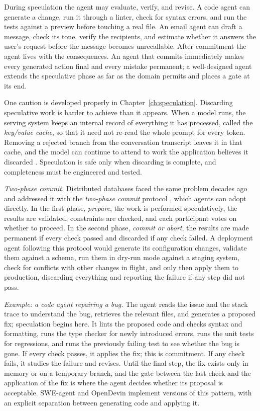 \documentclass[11pt]{book}
\begin{document}
During speculation the agent may evaluate, verify, and revise. A code agent can generate a change, run it through a linter, check for syntax errors, and run the tests against a preview before touching a real file. An email agent can draft a message, check its tone, verify the recipients, and estimate whether it answers the user's request before the message becomes unrecallable. After commitment the agent lives with the consequences. An agent that commits immediately makes every generated action final and every mistake permanent; a well-designed agent extends the speculative phase as far as the domain permits and places a gate at its end.

One caution is developed properly in Chapter~\ref{ch:speculation}. Discarding speculative work is harder to achieve than it appears. When a model runs, the serving system keeps an internal record of everything it has processed, called the \textit{key/value cache}, so that it need not re-read the whole prompt for every token. Removing a rejected branch from the conversation transcript leaves it in that cache, and the model can continue to attend to work the application believes it discarded \cite{abortedkv2026}. Speculation is safe only when discarding is complete, and completeness must be engineered and tested.

\textit{Two-phase commit.} Distributed databases faced the same problem decades ago and addressed it with the \emph{two-phase commit} protocol \cite{gray1978notes}, which agents can adopt directly. In the first phase, \textit{prepare}, the work is performed speculatively, the results are validated, constraints are checked, and each participant votes on whether to proceed. In the second phase, \textit{commit or abort}, the results are made permanent if every check passed and discarded if any check failed. A deployment agent following this protocol would generate its configuration changes, validate them against a schema, run them in dry-run mode against a staging system, check for conflicts with other changes in flight, and only then apply them to production, discarding everything and reporting the failure if any step did not pass.

\textit{Example: a code agent repairing a bug.} The agent reads the issue and the stack trace to understand the bug, retrieves the relevant files, and generates a proposed fix; speculation begins here. It lints the proposed code and checks syntax and formatting, runs the type checker for newly introduced errors, runs the unit tests for regressions, and runs the previously failing test to see whether the bug is gone. If every check passes, it applies the fix; this is commitment. If any check fails, it studies the failure and revises. Until the final step, the fix exists only in memory or on a temporary branch, and the gate between the last check and the application of the fix is where the agent decides whether its proposal is acceptable. SWE-agent \cite{yang2024sweagent} and OpenDevin \cite{wang2024opendevin} implement versions of this pattern, with an explicit separation between generating code and applying it.
\end{document}
